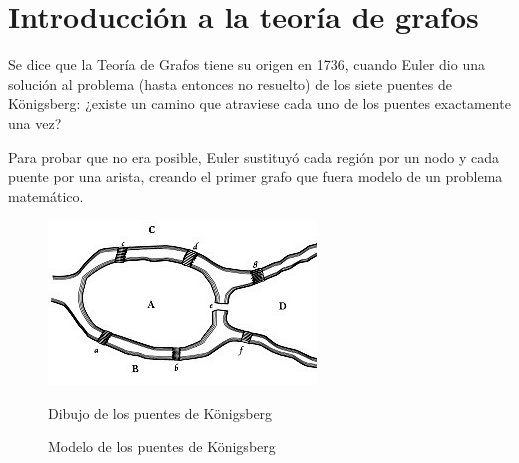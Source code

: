 \chapter{Introducción a la teoría de grafos}

Se dice que la Teoría de Grafos tiene su origen en 1736, cuando Euler dio una 
solución al problema (hasta entonces no resuelto) de los siete puentes de 
Königsberg: ¿existe un camino que atraviese cada uno de los puentes exactamente 
una vez?

Para probar que no era posible, Euler sustituyó cada región por un nodo y cada 
puente por una arista, creando el primer grafo que fuera modelo de un problema
matemático. 

\begin{figure}[h]
 \begin{minipage}[b]{.5\textwidth}
  \centering
  \includegraphics[scale=.75]{fig/images}
  \captionsetup{font=footnotesize}
  \caption{Dibujo de los puentes de Königsberg}
 \end{minipage}
 \begin{minipage}[b]{.5\textwidth}
  \centering
  \captionsetup{font=footnotesize}
  \caption{Modelo de los puentes de Königsberg}
 \end{minipage}
\end{figure}

